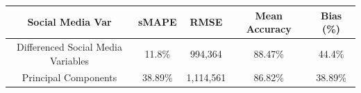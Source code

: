 \documentclass[12pt,oneside]{chicagocapstone}
\begin{document}
\begin{longtable}[]{@{}ccccc@{}}
\toprule
\begin{minipage}[b]{0.27\columnwidth}\centering\strut
Social Media Var\strut
\end{minipage} & \begin{minipage}[b]{0.13\columnwidth}\centering\strut
sMAPE\strut
\end{minipage} & \begin{minipage}[b]{0.14\columnwidth}\centering\strut
RMSE\strut
\end{minipage} & \begin{minipage}[b]{0.16\columnwidth}\centering\strut
Mean Accuracy\strut
\end{minipage} & \begin{minipage}[b]{0.16\columnwidth}\centering\strut
Bias (\%)\strut
\end{minipage}\tabularnewline
\midrule
\endhead
\begin{minipage}[t]{0.27\columnwidth}\centering\strut
Differenced Social Media Variables\strut
\end{minipage} & \begin{minipage}[t]{0.13\columnwidth}\centering\strut
11.8\%\strut
\end{minipage} & \begin{minipage}[t]{0.14\columnwidth}\centering\strut
994,364\strut
\end{minipage} & \begin{minipage}[t]{0.16\columnwidth}\centering\strut
88.47\%\strut
\end{minipage} & \begin{minipage}[t]{0.16\columnwidth}\centering\strut
44.4\%\strut
\end{minipage}\tabularnewline
\begin{minipage}[t]{0.27\columnwidth}\centering\strut
Principal Components\strut
\end{minipage} & \begin{minipage}[t]{0.13\columnwidth}\centering\strut
38.89\%\strut
\end{minipage} & \begin{minipage}[t]{0.14\columnwidth}\centering\strut
1,114,561\strut
\end{minipage} & \begin{minipage}[t]{0.16\columnwidth}\centering\strut
86.82\%\strut
\end{minipage} & \begin{minipage}[t]{0.16\columnwidth}\centering\strut
38.89\%\strut
\end{minipage}\tabularnewline
\bottomrule
\end{longtable}
\end{document}
